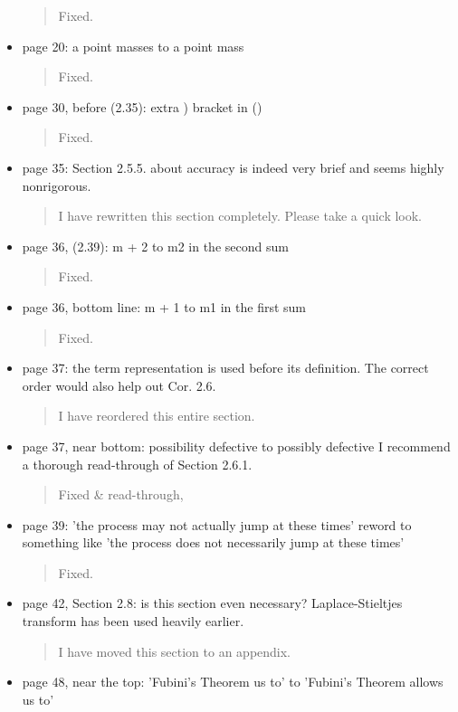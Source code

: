 \documentclass[a4paper]{article}
\begin{document}
\begin{itemize}
\begin{quote}
    Fixed. 
\end{quote}
\item {page 20: a point masses to a point mass}
\begin{quote}
    Fixed. 
\end{quote}
\item {page 30, before (2.35): extra ) bracket in ()}
\begin{quote}
    Fixed. 
\end{quote}
\item page 35: Section 2.5.5. about accuracy is indeed very brief and seems highly nonrigorous.
\begin{quote}
   I have rewritten this section completely. Please take a quick look.  
\end{quote}
\item {page 36, (2.39): m + 2 to m2 in the second sum}
\begin{quote}
    Fixed. 
\end{quote}
\item {page 36, bottom line: m + 1 to m1 in the first sum}
\begin{quote}
    Fixed. 
\end{quote}
\item {page 37: the term representation is used before its definition. The correct order
would also help out Cor. 2.6.}
\begin{quote}
    I have reordered this entire section. 
\end{quote}
\item {page 37, near bottom: possibility defective to possibly defective I recommend a
thorough read-through of Section 2.6.1.}
\begin{quote}
    Fixed \& read-through,
\end{quote}
\item {page 39: 'the process may not actually jump at these times' reword to something
like 'the process does not necessarily jump at these times'}
\begin{quote}
    Fixed. 
\end{quote}
\item {page 42, Section 2.8: is this section even necessary? Laplace-Stieltjes transform has been used heavily earlier.}
\begin{quote}
    I have moved this section to an appendix. 
\end{quote}
\item {page 48, near the top: 'Fubini's Theorem us to' to 'Fubini's Theorem allows us to'}

\end{itemize}
\end{document}
